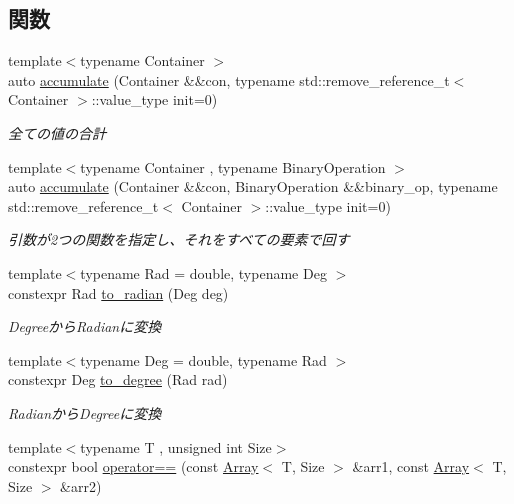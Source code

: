 \subsection*{関数}
\begin{DoxyCompactItemize}
\item 
{\footnotesize template$<$typename Container $>$ }\\auto \mbox{\hyperlink{namespacesaki_a981cc67b0d421b1836678c3ac4069afd}{accumulate}} (Container \&\&con, typename std\+::remove\+\_\+reference\+\_\+t$<$ Container $>$\+::value\+\_\+type init=0)
\begin{DoxyCompactList}\small\item\em 全ての値の合計 \end{DoxyCompactList}\item 
{\footnotesize template$<$typename Container , typename Binary\+Operation $>$ }\\auto \mbox{\hyperlink{namespacesaki_acb8c3f650d3b5d3b06259b91bd7ad85d}{accumulate}} (Container \&\&con, Binary\+Operation \&\&binary\+\_\+op, typename std\+::remove\+\_\+reference\+\_\+t$<$ Container $>$\+::value\+\_\+type init=0)
\begin{DoxyCompactList}\small\item\em 引数が2つの関数を指定し、それをすべての要素で回す \end{DoxyCompactList}\item 
{\footnotesize template$<$typename Rad  = double, typename Deg $>$ }\\constexpr Rad \mbox{\hyperlink{namespacesaki_aae246ec576e9e2da23c0c142e6fc4d6a}{to\+\_\+radian}} (Deg deg)
\begin{DoxyCompactList}\small\item\em Degreeから\+Radianに変換 \end{DoxyCompactList}\item 
{\footnotesize template$<$typename Deg  = double, typename Rad $>$ }\\constexpr Deg \mbox{\hyperlink{namespacesaki_aa28ebe642bd2c0e608e2a61c34b3d7a5}{to\+\_\+degree}} (Rad rad)
\begin{DoxyCompactList}\small\item\em Radianから\+Degreeに変換 \end{DoxyCompactList}\item 
{\footnotesize template$<$typename T , unsigned int Size$>$ }\\constexpr bool \mbox{\hyperlink{namespacesaki_a2e9a71ad1df5a0fcf7c0b191ef90c1c4}{operator==}} (const \mbox{\hyperlink{classsaki_1_1_array}{Array}}$<$ T, Size $>$ \&arr1, const \mbox{\hyperlink{classsaki_1_1_array}{Array}}$<$ T, Size $>$ \&arr2)

\end{DoxyCompactItemize}
